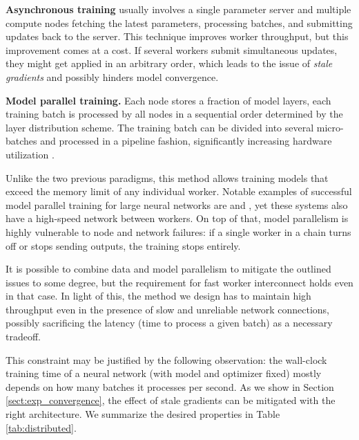 \textbf{Asynchronous training} \cite{recht2011hogwild, zhang2015staleness} usually involves a single parameter server and multiple compute nodes fetching the latest parameters, processing batches, and submitting updates back to the server. This technique improves worker throughput, but this improvement comes at a cost. If several workers submit simultaneous updates, they might get applied in an arbitrary order, which leads to the issue of \textit{stale gradients} \cite{stale_gradients_can_win} and possibly hinders model convergence.

\textbf{Model parallel training.} Each node stores a fraction of model layers, each training batch is processed by all nodes in a sequential order determined by the layer distribution scheme. The training batch can be divided into several micro-batches and processed in a pipeline fashion, significantly increasing hardware utilization \cite{huang2019gpipe,zero,pipemare,pipedream}.
    
Unlike the two previous paradigms, this method allows training models that exceed the memory limit of any individual worker. Notable examples of successful model parallel training for large neural networks are \cite{huang2019gpipe} and \cite{shoeybi2019megatron}, yet these systems also have a high-speed network between workers. On top of that, model parallelism is highly vulnerable to node and network failures: if a single worker in a chain turns off or stops sending outputs, the training stops entirely. 

It is possible to combine data and model parallelism to mitigate the outlined issues to some degree, but the requirement for fast worker interconnect holds even in that case. In light of this, the method we design has to maintain high throughput even in the presence of slow and unreliable network connections, possibly sacrificing the latency (time to process a given batch) as a necessary tradeoff. 

This constraint may be justified by the following observation: the wall-clock training time of a neural network (with model and optimizer fixed) mostly depends on how many batches it processes per second. As we show in Section \ref{sect:exp_convergence}, the effect of stale gradients can be mitigated with the right architecture. We summarize the desired properties in Table \ref{tab:distributed}.

